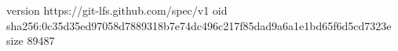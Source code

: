 version https://git-lfs.github.com/spec/v1
oid sha256:0c35d35ed97058d7889318b7e74dc496c217f85dad9a6a1e1bd65f6d5cd7323e
size 89487
